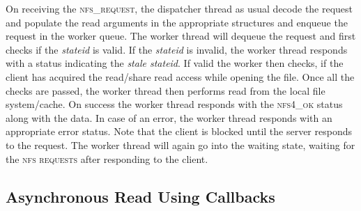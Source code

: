On receiving the \textsc{nfs\_request}, the dispatcher thread as usual decode the request and populate the read arguments in the appropriate structures and enqueue the request in the worker queue. The worker thread will dequeue the request and first checks if the \textit{stateid} is valid. If the \textit{stateid} is invalid, the worker thread responds with a status indicating the \textit{stale stateid}. If valid the worker then checks, if the client has acquired the read/share read access while opening the file. Once all the checks are passed, the worker thread then performs read from the local file system/cache. On success the worker thread responds with the \textsc{nfs4\_ok} status along with the data. In case of an error, the worker thread responds with an appropriate error status. Note that the client is blocked until the server responds to the request. The worker thread will again go into the waiting state, waiting for the \textsc{nfs requests} after responding to the client.


\subsection{Asynchronous Read Using Callbacks}

